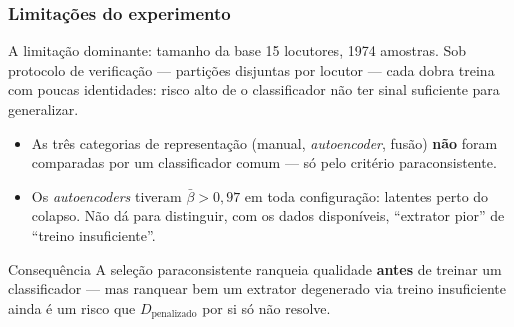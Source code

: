 \begin{frame}
	\frametitle{Limitações do experimento}
	\small
	\begin{block}{A limitação dominante: tamanho da base}
		15 locutores, 1974 amostras. Sob protocolo de verificação --- partições disjuntas por locutor --- cada dobra treina com poucas identidades: risco alto de o classificador não ter sinal suficiente para generalizar.
	\end{block}
	\begin{itemize}
		\item As três categorias de representação (manual, \textit{autoencoder}, fusão) \textbf{não} foram comparadas por um classificador comum --- só pelo critério paraconsistente.
		\item Os \textit{autoencoders} tiveram $\bar\beta > 0{,}97$ em toda configuração: latentes perto do colapso. Não dá para distinguir, com os dados disponíveis, ``extrator pior'' de ``treino insuficiente''.
	\end{itemize}
	\begin{alertblock}{Consequência}
		A seleção paraconsistente ranqueia qualidade \textbf{antes} de treinar um classificador --- mas ranquear bem um extrator degenerado via treino insuficiente ainda é um risco que $D_{\text{penalizado}}$ por si só não resolve.
	\end{alertblock}
\end{frame}

